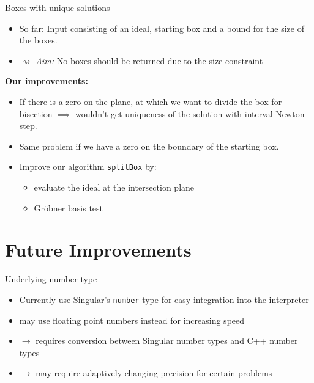 \documentclass[german,10pt,xcolor=colortbl,compress,handout]{beamer}
\begin{document}
\begin{frame}{Boxes with unique solutions}
    \begin {itemize}
        \item So far: Input consisting of an ideal, starting box and a bound for the size
            of the boxes.
        \item[]$\rightsquigarrow$ \emph{Aim:} No boxes should be returned due to the size
            constraint
    \end{itemize}
    \pause
    \textbf{Our improvements:}
    \begin{itemize}
        \pause
        \item If there is a zero on the plane, at which we want to divide the box for
            bisection $\implies$ wouldn't get uniqueness of the solution with interval
            Newton step.
        \item Same problem if we have a zero on the boundary of the starting box.
        \pause
        \item Improve our algorithm \texttt{splitBox} by:
        \pause
        \begin{itemize}
            \item evaluate the ideal at the intersection plane
            \item Gröbner basis test
        \end{itemize}
    \end{itemize}
\end{frame}

\section{Future Improvements}

\begin{frame}{Underlying number type}
    \begin{itemize}
        \item Currently use Singular's \texttt{number} type for easy integration into the
            interpreter
        \item may use floating point numbers instead for increasing speed
        \item[] $\rightarrow$ requires conversion between Singular number types and C++
            number types
        \item[] $\rightarrow$ may require adaptively changing precision for certain
            problems
    \end{itemize}
\end{frame}
\end{document}
